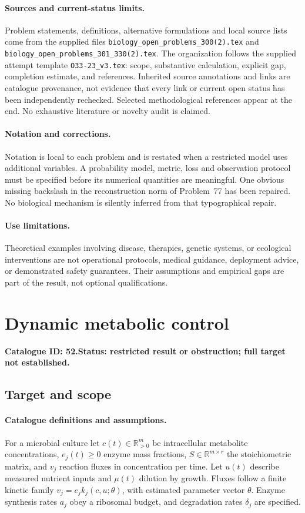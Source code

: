 \documentclass[11pt]{article}
\newcommand{\R}{\mathbb R}
\providecommand{\R}{\mathbb R}
\begin{document}
\paragraph{Sources and current-status limits.}
Problem statements, definitions, alternative formulations and local source lists
come from the supplied files
\texttt{biology\_open\_problems\_300(2).tex} and
\texttt{biology\_open\_problems\_301\_330(2).tex}.
The organization follows the supplied attempt template
\texttt{O33-23\_v3.tex}: scope, substantive calculation, explicit gap,
completion estimate, and references. Inherited source annotations and links are
catalogue provenance, not evidence that every link or current open status has
been independently rechecked. Selected methodological references appear at the
end. No exhaustive literature or novelty audit is claimed.

\paragraph{Notation and corrections.}
Notation is local to each problem and is restated when a restricted model uses
additional variables. A probability model, metric, loss and observation protocol
must be specified before its numerical quantities are meaningful. One obvious
missing backslash in the reconstruction norm of Problem~77 has been repaired.
No biological mechanism is silently inferred from that typographical repair.

\paragraph{Use limitations.}
Theoretical examples involving disease, therapies, genetic systems, or ecological
interventions are not operational protocols, medical guidance, deployment advice,
or demonstrated safety guarantees. Their assumptions and empirical gaps are part
of the result, not optional qualifications.

\setcounter{section}{51}
\section{Dynamic metabolic control}
\label{prob:052}
\noindent\textbf{Catalogue ID: 52.}\quad \textbf{Status: restricted result or obstruction; full target not established.}
\subsection{Target and scope}
\paragraph{Catalogue definitions and assumptions.}
For a microbial culture let $c(t)\in\R_{>0}^m$ be intracellular metabolite concentrations, $e_j(t)\ge0$ enzyme mass fractions, $S\in\R^{m\times r}$ the stoichiometric matrix, and $v_j$ reaction fluxes in concentration per time. Let $u(t)$ describe measured nutrient inputs and $\mu(t)$ dilution by growth. Fluxes follow a finite kinetic family $v_j=e_jk_j(c,u;\theta)$, with estimated parameter vector $\theta$. Enzyme synthesis rates $a_j$ obey a ribosomal budget, and degradation rates $\delta_j$ are specified.
\end{document}
